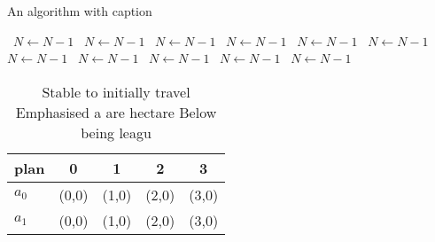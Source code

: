 \documentclass[a4paper]{article}
\begin{document}
\begin{algorithm}
\caption{An algorithm with caption}
\begin{algorithmic}
\    \State $N \gets N - 1$
\    \State $N \gets N - 1$
\    \State $N \gets N - 1$
\    \State $N \gets N - 1$
\    \State $N \gets N - 1$
\    \State $N \gets N - 1$
\    \State $N \gets N - 1$
\    \State $N \gets N - 1$
\    \State $N \gets N - 1$
\    \State $N \gets N - 1$
\    \State $N \gets N - 1$
\EndWhile
\end{algorithmic}
\end{algorithm}

\begin{table}
\begin{adjustbox}{width=0.5\columnwidth}
\begin{tabular}{|l|l|l|l|l|}
\hline
\textbf{plan} & \multicolumn{1}{c|}{\textbf{0}} & \multicolumn{1}{c|}{\textbf{1}} & \multicolumn{1}{c|}{\textbf{2}} & \multicolumn{1}{c|}{\textbf{3}} \\ \hline
\textbf{$a_0$}  & (0,0) & (1,0) & (2,0) & (3,0) \\ \hline
\textbf{$a_1$}  & (0,0) & (1,0) & (2,0) & (3,0) \\ \hline
\end{tabular}
\end{adjustbox}
\caption{Stable to initially travel Emphasised a are hectare Below being leagu
}
\end{table}
\end{document}

